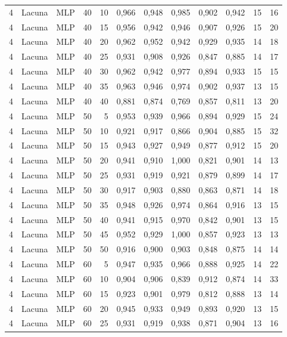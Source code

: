 \begin{longtable}{@{}rllrrrrrrrrr@{}}
4 & Lacuna & MLP & 40 & 10 & 0,966 & 0,948 & 0,985 & 0,902 & 0,942 & 15 & 16 \\
4 & Lacuna & MLP & 40 & 15 & 0,956 & 0,942 & 0,946 & 0,907 & 0,926 & 15 & 20 \\
4 & Lacuna & MLP & 40 & 20 & 0,962 & 0,952 & 0,942 & 0,929 & 0,935 & 14 & 18 \\
4 & Lacuna & MLP & 40 & 25 & 0,931 & 0,908 & 0,926 & 0,847 & 0,885 & 14 & 17 \\
4 & Lacuna & MLP & 40 & 30 & 0,962 & 0,942 & 0,977 & 0,894 & 0,933 & 15 & 15 \\
4 & Lacuna & MLP & 40 & 35 & 0,963 & 0,946 & 0,974 & 0,902 & 0,937 & 13 & 15 \\
4 & Lacuna & MLP & 40 & 40 & 0,881 & 0,874 & 0,769 & 0,857 & 0,811 & 13 & 20 \\
4 & Lacuna & MLP & 50 & 5 & 0,953 & 0,939 & 0,966 & 0,894 & 0,929 & 15 & 24 \\
4 & Lacuna & MLP & 50 & 10 & 0,921 & 0,917 & 0,866 & 0,904 & 0,885 & 15 & 32 \\
4 & Lacuna & MLP & 50 & 15 & 0,943 & 0,927 & 0,949 & 0,877 & 0,912 & 15 & 20 \\
4 & Lacuna & MLP & 50 & 20 & 0,941 & 0,910 & 1,000 & 0,821 & 0,901 & 14 & 13 \\
4 & Lacuna & MLP & 50 & 25 & 0,931 & 0,919 & 0,921 & 0,879 & 0,899 & 14 & 17 \\
4 & Lacuna & MLP & 50 & 30 & 0,917 & 0,903 & 0,880 & 0,863 & 0,871 & 14 & 18 \\
4 & Lacuna & MLP & 50 & 35 & 0,948 & 0,926 & 0,974 & 0,864 & 0,916 & 13 & 15 \\
4 & Lacuna & MLP & 50 & 40 & 0,941 & 0,915 & 0,970 & 0,842 & 0,901 & 13 & 15 \\
4 & Lacuna & MLP & 50 & 45 & 0,952 & 0,929 & 1,000 & 0,857 & 0,923 & 13 & 13 \\
4 & Lacuna & MLP & 50 & 50 & 0,916 & 0,900 & 0,903 & 0,848 & 0,875 & 14 & 14 \\
4 & Lacuna & MLP & 60 & 5 & 0,947 & 0,935 & 0,966 & 0,888 & 0,925 & 14 & 22 \\
4 & Lacuna & MLP & 60 & 10 & 0,904 & 0,906 & 0,839 & 0,912 & 0,874 & 14 & 33 \\
4 & Lacuna & MLP & 60 & 15 & 0,923 & 0,901 & 0,979 & 0,812 & 0,888 & 13 & 14 \\
4 & Lacuna & MLP & 60 & 20 & 0,945 & 0,933 & 0,949 & 0,893 & 0,920 & 13 & 15 \\
4 & Lacuna & MLP & 60 & 25 & 0,931 & 0,919 & 0,938 & 0,871 & 0,904 & 13 & 16 \\

\end{longtable}
